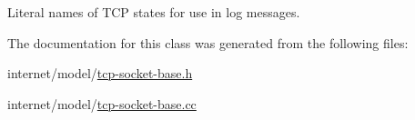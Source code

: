 Literal names of T\+CP states for use in log messages. 



The documentation for this class was generated from the following files\+:\begin{DoxyCompactItemize}
\item 
internet/model/\hyperlink{tcp-socket-base_8h}{tcp-\/socket-\/base.\+h}\item 
internet/model/\hyperlink{tcp-socket-base_8cc}{tcp-\/socket-\/base.\+cc}\end{DoxyCompactItemize}
